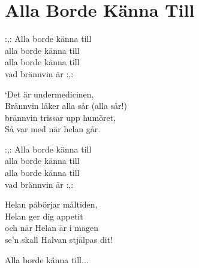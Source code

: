 \section{Alla Borde Känna Till}
:,: Alla borde känna till\\
alla borde känna till\\
alla borde känna till\\
vad brännvin är :,:

‘Det är undermedicinen,\\
Brännvin läker alla sår (alla sår!)\\
brännvin trissar upp humöret,\\
Så var med när helan går.

:,: Alla borde känna till\\
alla borde känna till\\
alla borde känna till\\
vad brännvin är :,:

Helan påbörjar måltiden,\\
Helan ger dig appetit\\
och när Helan är i magen\\
se’n skall Halvan stjälpas dit!

Alla borde känna till...